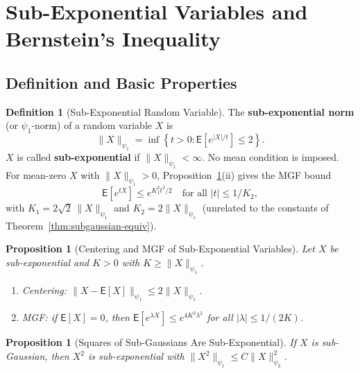 \documentclass[14pt]{extarticle}
\theoremstyle{plain}
\newtheorem{proposition}[theorem]{Proposition}
\theoremstyle{definition}
\newtheorem{definition}{Definition}[section]
\theoremstyle{remark}
\newcommand\expc{\mathsf{E}}
\begin{document}
\section{Sub-Exponential Variables and Bernstein's Inequality}\label{sec:subexp}

\subsection{Definition and Basic Properties}

\begin{definition}[Sub-Exponential Random Variable]\label{def:subexponential}
The \textbf{sub-exponential norm} (or $\psi_1$-norm) of a random variable $X$ is
\begin{equation}\label{eq:psi1}
\|X\|_{\psi_1} = \inf\!\left\{t > 0 : \expc\!\left[e^{|X|/t}\right] \leqslant 2\right\}.
\end{equation}
$X$ is called \textbf{sub-exponential} if $\|X\|_{\psi_1} < \infty$. No mean condition is imposed. For mean-zero $X$ with $\|X\|_{\psi_1} > 0$, Proposition~\ref{prop:subexp-mgf}(ii) gives the MGF bound
\begin{equation}\label{eq:subexp-mgf}
\expc[e^{tX}] \leqslant e^{K_1^2 t^2/2} \quad \text{for all } |t| \leqslant 1/K_2,
\end{equation}
with $K_1 = 2\sqrt{2}\,\|X\|_{\psi_1}$ and $K_2 = 2\|X\|_{\psi_1}$ (unrelated to the constants of Theorem~\ref{thm:subgaussian-equiv}).
\end{definition}

\begin{proposition}[Centering and MGF of Sub-Exponential Variables]\label{prop:subexp-mgf}
Let $X$ be sub-exponential and $K > 0$ with $K \geqslant \|X\|_{\psi_1}$.
\begin{enumerate}[label=\textup{(\roman*)}]
\item \emph{Centering:} $\|X - \expc[X]\|_{\psi_1} \leqslant 2\|X\|_{\psi_1}$.
\item \emph{MGF:} if $\expc[X] = 0$, then $\expc[e^{\lambda X}] \leqslant e^{4K^2\lambda^2}$ for all $|\lambda| \leqslant 1/(2K)$.
\end{enumerate}
\end{proposition}

\begin{proposition}[Squares of Sub-Gaussians Are Sub-Exponential]\label{prop:sg-square}
If $X$ is sub-Gaussian, then $X^2$ is sub-exponential with $\|X^2\|_{\psi_1} \leqslant C\|X\|_{\psi_2}^2$.
\end{proposition}
\end{document}
